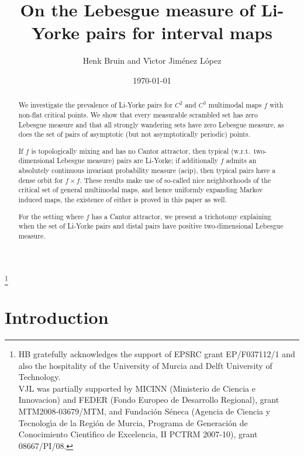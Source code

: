 \documentclass[12pt, psamsfonts, reqno]{amsart}
\begin{document}

\title[version of \today]
{On the Lebesgue measure of Li-Yorke pairs for interval maps}
\author{Henk Bruin
and V\'{\i}ctor Jim\'enez L\'opez}
\thanks{HB gratefully acknowledges the support of EPSRC
grant EP/F037112/1 and also the hospitality of the University of Murcia and
Delft University of Technology.
\\ \indent
 VJL was partially supported by MICINN
(Ministerio de Ciencia e Innovacion) and FEDER (Fondo Europeo de
Desarrollo Regional), grant MTM2008-03679/MTM, and Fundaci\'on
S\'eneca (Agencia de Ciencia y Tecnolog\'{\i}a de la Regi\'on de
Murcia, Programa de Generaci\'on de Conocimiento Cient\'{\i}fico
de Excelencia, II PCTRM 2007-10), grant 08667/PI/08.}

\date{\today}

\begin{abstract}
We investigate the prevalence of Li-Yorke pairs
for $C^2$ and $C^3$ multimodal maps $f$ with non-flat critical points. We
show that every measurable scrambled set has zero Lebesgue
measure and that all strongly wandering sets have
zero Lebesgue measure, as does the set of pairs of asymptotic (but not
asymptotically periodic) points.

If $f$ is topologically mixing and has no Cantor attractor, then
typical (w.r.t.\ two-dimen\-sional Lebesgue measure) pairs are
Li-Yorke; if additionally $f$ admits an absolutely continuous
invariant probability measure (acip), then typical pairs have a
dense orbit for $f \times f$.
These results make use of so-called nice neighborhoods of the
critical set of general multimodal maps, and hence uniformly expanding
Markov induced maps, the existence of either is proved in this paper as well.

For the setting where $f$ has a Cantor attractor, we present a
trichotomy explaining when the set of Li-Yorke pairs and distal
pairs have positive two-dimensional Lebesgue measure.
\end{abstract}

\maketitle

\section{Introduction}\label{sec:intro}
\end{document}
